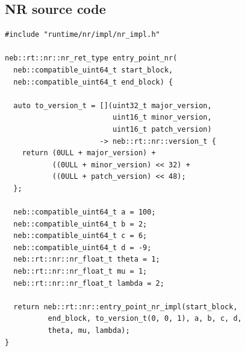 \documentclass[11pt]{article}
\begin{document}
\subsection{NR source code}
\begin{lstlisting}
#include "runtime/nr/impl/nr_impl.h"

neb::rt::nr::nr_ret_type entry_point_nr(
  neb::compatible_uint64_t start_block,
  neb::compatible_uint64_t end_block) {

  auto to_version_t = [](uint32_t major_version,
                         uint16_t minor_version,
                         uint16_t patch_version)
                      -> neb::rt::nr::version_t {
    return (0ULL + major_version) +
           ((0ULL + minor_version) << 32) +
           ((0ULL + patch_version) << 48);
  };

  neb::compatible_uint64_t a = 100;
  neb::compatible_uint64_t b = 2;
  neb::compatible_uint64_t c = 6;
  neb::compatible_uint64_t d = -9;
  neb::rt::nr::nr_float_t theta = 1;
  neb::rt::nr::nr_float_t mu = 1;
  neb::rt::nr::nr_float_t lambda = 2;

  return neb::rt::nr::entry_point_nr_impl(start_block,
          end_block, to_version_t(0, 0, 1), a, b, c, d,
          theta, mu, lambda);
}
\end{lstlisting}
\end{document}
